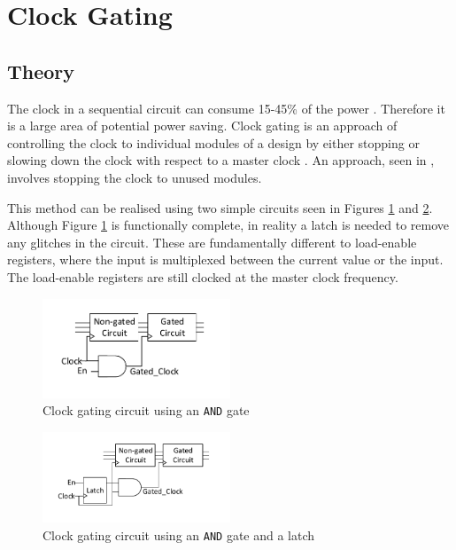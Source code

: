 
\section{Clock Gating}

\subsection{Theory}

The clock in a sequential circuit can consume 15-45\% of the power \cite{pedram1996power}.
Therefore it is a large area of potential power saving.
Clock gating is an approach of controlling the clock to individual modules of a design by either stopping or slowing down the clock with respect to a master clock \cite{841927}. 
An approach, seen in \cite{tellez1995activity}, involves stopping the clock to unused modules.

This method can be realised using two simple circuits seen in Figures \ref{fig:cg:circuit1} and \ref{fig:cg:circuit2}.
Although Figure \ref{fig:cg:circuit1} is functionally complete, in reality a latch is needed to remove any glitches in the circuit.
These are fundamentally different to load-enable registers, where the input is multiplexed between the current value or the input.
The load-enable registers are still clocked at the master clock frequency.

\begin{figure}[t]
\centering
\includegraphics[width=0.5\textwidth]{Figures/clockgating_and.pdf}
\caption{Clock gating circuit using an \texttt{AND} gate}
\label{fig:cg:circuit1}
\end{figure}

\begin{figure}[b]
\includegraphics[width=0.5\textwidth]{Figures/clockgating_latch.pdf}
\caption{Clock gating circuit using an \texttt{AND} gate and a latch}
\label{fig:cg:circuit2}
\end{figure}

